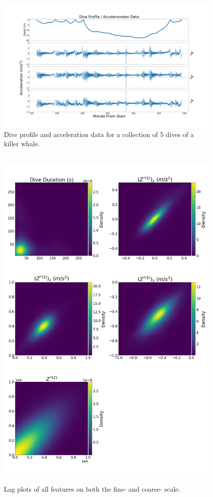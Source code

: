 \begin{figure}[ht]
	\centering
	\includegraphics[width=5in]{../Plots/raw_data_5_dives.png}
	\caption{Dive profile and acceleration data for a collection of 5 dives of a killer whale.}
	\label{fig:data_one_dive}
\end{figure}

\begin{figure}[ht]
	\centering
	\includegraphics[height=7in]{../Plots/lagplot.png}
	\caption{Lag plots of all features on both the fine- and coarse- scale.}
	\label{fig:lag}
\end{figure}

